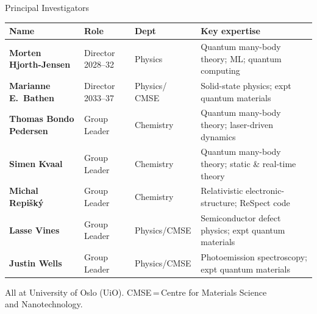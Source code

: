 \documentclass[aspectratio=169,10pt]{beamer}
\begin{document}
\begin{frame}{Principal Investigators}
  \renewcommand{\arraystretch}{1.25}
  \footnotesize
  \begin{tabular}{>{\bfseries}p{3.5cm}
                  p{2.5cm}
                  p{1.7cm}
                  p{5.9cm}}
    \toprule
    Name & Role & Dept & Key expertise \\
    \midrule
    Morten Hjorth-Jensen
      & Director 2028--32
      & Physics
      & Quantum many-body theory; ML; quantum computing \\
    Marianne E.\ Bathen
      & Director 2033--37
      & Physics/ CMSE
      & Solid-state physics; expt quantum materials \\
    Thomas Bondo Pedersen
      & Group Leader
      & Chemistry
      & Quantum many-body theory; laser-driven dynamics \\
    Simen Kvaal
      & Group Leader
      & Chemistry
      & Quantum many-body theory; static \& real-time theory \\
    Michal Repi\v{s}k\'{y}
      & Group Leader
      & Chemistry
      & Relativistic electronic-structure; ReSpect code \\
    Lasse Vines
      & Group Leader
      & Physics/CMSE
      & Semiconductor defect physics; expt quantum materials \\
    Justin Wells
      & Group Leader
      & Physics/CMSE
      & Photoemission spectroscopy; expt quantum materials \\
    \bottomrule
  \end{tabular}
  \vspace{3pt}
  \newline
  {\scriptsize All at University of Oslo (UiO).
  CMSE\,=\,Centre for Materials Science\\ and Nanotechnology.}
\end{frame}
\end{document}

